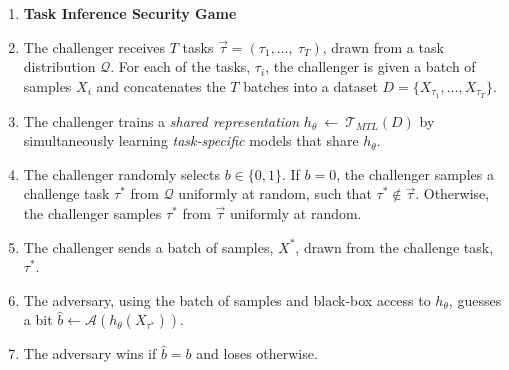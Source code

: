 












 \begin{enumerate}[labelsep=*,leftmargin=15pt]
     \item[]  \begin{center}
         \textbf{Task Inference Security Game}
     \end{center} 
     \item The challenger receives $T$ tasks $\vec{\tau} = ( \tau_1, \dots, \: \tau_T )$, drawn from a task distribution $\mathcal{Q}$. For each of the tasks, $\tau_i$, the challenger is given a batch of samples $X_i$ and concatenates the $T$ batches into a dataset $D = \{X_{\tau_1}, \dots, X_{\tau_T} \}$.
     \item The challenger trains a \textit{shared representation} $h_\theta~\gets~\mathcal{T}_{\mathit{MTL}}(D)$ by simultaneously learning \emph{task-specific} models that share $h_\theta$.
     \item The challenger randomly selects $b \in \{0, 1\}$. If  $b = 0$, the challenger samples a challenge task $\tau^*$ from $\mathcal{Q}$ uniformly at random, such that $\tau^* \notin \vec{\tau}$. Otherwise, the challenger samples $\tau^*$ from $\vec{\tau}$ uniformly at random. 
     \item The challenger sends a batch of samples, $X^*$, drawn from the challenge task, $\tau^*$.
     \item The adversary, using the batch of samples and black-box access to $h_\theta$, guesses a bit $\hat{b} \gets \mathcal{A}(h_\theta(X_{\tau^*}))$.
     \item The adversary wins if $\hat{b} = b$ and loses otherwise.
 \end{enumerate}

